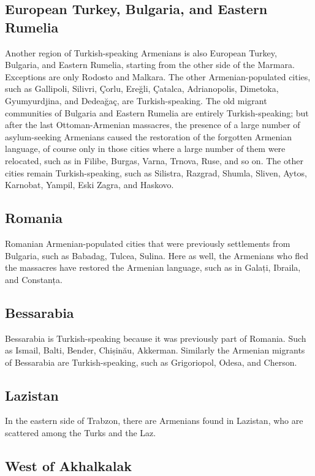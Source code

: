 \subsection{European Turkey, Bulgaria, and Eastern Rumelia}
Another region of Turkish-speaking Armenians is also European Turkey, Bulgaria, and Eastern Rumelia, starting from the other side of the Marmara. Exceptions are only Rodosto and Malkara. The other Armenian-populated cities, such as Gallipoli, Silivri, Çorlu, Ereğli, Çatalca, Adrianopolis, Dimetoka, Gyumyurdjina, and Dedeağaç, are Turkish-speaking. The old migrant communities of Bulgaria and Eastern Rumelia are entirely Turkish-speaking; but after the last Ottoman-Armenian massacres, the presence of a large number of asylum-seeking Armenians caused the restoration of the forgotten Armenian language, of course only in those cities where a large number of them were relocated, such as in Filibe, Burgas, Varna, Trnova, Ruse, and so on. The other cities remain Turkish-speaking, such as Silistra, Razgrad, Shumla, Sliven, Aytos, Karnobat, Yampil, Eski Zagra, and Haskovo. 
\subsection{Romania}
Romanian Armenian-populated cities that were previously settlements from Bulgaria, such as Babadag, Tulcea, Sulina. Here as well, the Armenians who fled the massacres have restored the Armenian language, such as in Galați, Ibraila, and Constanța. 

\subsection{Bessarabia}

Bessarabia is Turkish-speaking because it was previously part of Romania. Such as Ismail, Balti, Bender, Chișinău, Akkerman. Similarly the Armenian migrants of Bessarabia are Turkish-speaking, such as Grigoriopol, Odesa, and Cherson.

\subsection{Lazistan}
In the eastern side of Trabzon, there are Armenians found in Lazistan, who are scattered among the Turks and the Laz.

\subsection{West of Akhalkalak}

